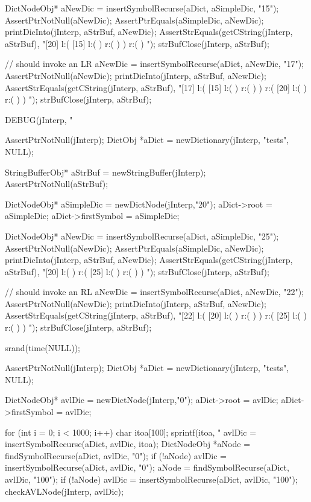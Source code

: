   DictNodeObj* aNewDic = insertSymbolRecurse(aDict, aSimpleDic, "15");
  AssertPtrNotNull(aNewDic);
  AssertPtrEquals(aSimpleDic, aNewDic);
  printDicInto(jInterp, aStrBuf, aNewDic);
  AssertStrEquals(getCString(jInterp, aStrBuf),
  "[20] l:( [15] l:(  ) r:(  )  ) r:(  ) ");
  strBufClose(jInterp, aStrBuf);
  
  // should invoke an LR
  aNewDic = insertSymbolRecurse(aDict, aNewDic, "17");
  AssertPtrNotNull(aNewDic);
  printDicInto(jInterp, aStrBuf, aNewDic);
  AssertStrEquals(getCString(jInterp, aStrBuf),
  "[17] l:( [15] l:(  ) r:(  )  ) r:( [20] l:(  ) r:(  )  ) ");
  strBufClose(jInterp, aStrBuf);
\stopCTest
\stopTestCase


\startCTest
  DEBUG(jInterp, "\n%

  AssertPtrNotNull(jInterp);
  DictObj *aDict = newDictionary(jInterp, "tests", NULL);

  StringBufferObj* aStrBuf = newStringBuffer(jInterp);
  AssertPtrNotNull(aStrBuf);
  
  DictNodeObj* aSimpleDic = newDictNode(jInterp,"20");
  aDict->root             = aSimpleDic;
  aDict->firstSymbol      = aSimpleDic;

  DictNodeObj* aNewDic = insertSymbolRecurse(aDict, aSimpleDic, "25");
  AssertPtrNotNull(aNewDic);
  AssertPtrEquals(aSimpleDic, aNewDic);
  printDicInto(jInterp, aStrBuf, aNewDic);
  AssertStrEquals(getCString(jInterp, aStrBuf),
  "[20] l:(  ) r:( [25] l:(  ) r:(  )  ) ");
  strBufClose(jInterp, aStrBuf);
  
  // should invoke an RL
  aNewDic = insertSymbolRecurse(aDict, aNewDic, "22");
  AssertPtrNotNull(aNewDic);
  printDicInto(jInterp, aStrBuf, aNewDic);
  AssertStrEquals(getCString(jInterp, aStrBuf),
  "[22] l:( [20] l:(  ) r:(  )  ) r:( [25] l:(  ) r:(  )  ) ");
  strBufClose(jInterp, aStrBuf);
\stopCTest
\stopTestCase

\startCTest

  srand(time(NULL));

  AssertPtrNotNull(jInterp);
  DictObj *aDict = newDictionary(jInterp, "tests", NULL);

  DictNodeObj* avlDic = newDictNode(jInterp,"0");
  aDict->root         = avlDic;
  aDict->firstSymbol  = avlDic;

  for (int i = 0; i < 1000; i++) {
    char itoa[100];
    sprintf(itoa, "%
    avlDic = insertSymbolRecurse(aDict, avlDic, itoa);
  }
  DictNodeObj *aNode = findSymbolRecurse(aDict, avlDic, "0");
  if (!aNode) avlDic = insertSymbolRecurse(aDict, avlDic, "0");
  aNode = findSymbolRecurse(aDict, avlDic, "100");
  if (!aNode) avlDic = insertSymbolRecurse(aDict, avlDic, "100");
  checkAVLNode(jInterp, avlDic);

